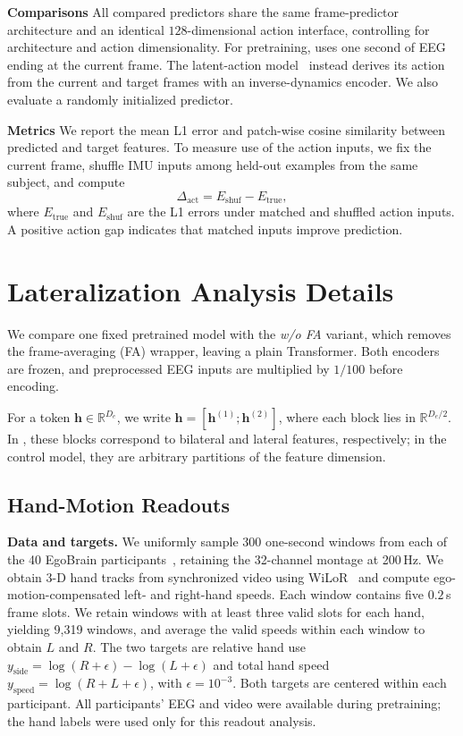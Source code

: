 \noindent\textbf{Comparisons}
All compared predictors share the same frame-predictor architecture and an identical $128$-dimensional action interface, controlling for architecture and action dimensionality. For pretraining, \mwm{} uses one second of EEG ending at the current frame. The latent-action model~\citep{garrido2026lawm} instead derives its action from the current and target frames with an inverse-dynamics encoder. We also evaluate a randomly initialized predictor.

\noindent\textbf{Metrics}
We report the mean L1 error and patch-wise cosine similarity between predicted and target features. To measure use of the action inputs, we fix the current frame, shuffle IMU inputs among held-out examples from the same subject, and compute
\begin{equation}
    \Delta_{\mathrm{act}}=E_{\mathrm{shuf}}-E_{\mathrm{true}},
\end{equation}
where $E_{\mathrm{true}}$ and $E_{\mathrm{shuf}}$ are the L1 errors under matched and shuffled action inputs. A positive action gap indicates that matched inputs improve prediction.

\section{Lateralization Analysis Details}
\label{app:mwm-laterality-analysis}

We compare one fixed pretrained \mwm{} model with the \emph{w/o FA} variant, which removes the frame-averaging (FA) wrapper, leaving a plain Transformer. Both encoders are frozen, and preprocessed EEG inputs are multiplied by $1/100$ before encoding.

For a token $\mathbf{h}\in\mathbb{R}^{D_e}$, we write $\mathbf{h}=[\mathbf{h}^{(1)};\mathbf{h}^{(2)}]$, where each block lies in $\mathbb{R}^{D_e/2}$. In \mwm{}, these blocks correspond to bilateral and lateral features, respectively; in the control model, they are arbitrary partitions of the feature dimension.

\subsection{Hand-Motion Readouts}

\noindent\textbf{Data and targets.}
We uniformly sample 300 one-second windows from each of the 40 EgoBrain participants~\citep{lin2026egobrain}, retaining the 32-channel montage at 200\,Hz. We obtain 3-D hand tracks from synchronized video using WiLoR~\citep{potamias2025wilor} and compute ego-motion-compensated left- and right-hand speeds. Each window contains five $0.2$\,s frame slots. We retain windows with at least three valid slots for each hand, yielding 9,319 windows, and average the valid speeds within each window to obtain $L$ and $R$. The two targets are relative hand use \mbox{$y_{\mathrm{side}}=\log(R+\epsilon)-\log(L+\epsilon)$} and total hand speed $y_{\mathrm{speed}}=\log(R+L+\epsilon)$, with $\epsilon=10^{-3}$. Both targets are centered within each participant. All participants' EEG and video were available during pretraining; the hand labels were used only for this readout analysis.

